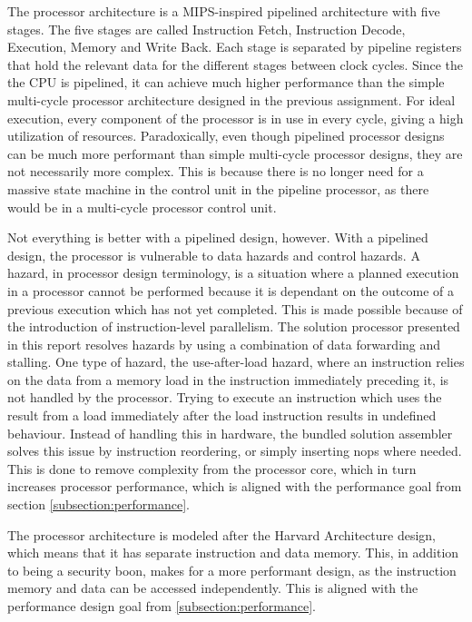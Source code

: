 The processor architecture is a MIPS-inspired pipelined architecture with five stages.
The five stages are called Instruction Fetch, Instruction Decode, Execution, Memory and Write Back.
Each stage is separated by pipeline registers that hold the relevant data for the different stages between clock cycles.
Since the the CPU is pipelined, it can achieve much higher performance than the simple multi-cycle processor architecture designed in the previous assignment\cite{assignment-1}.
For ideal execution, every component of the processor is in use in every cycle, giving a high utilization of resources.
Paradoxically, even though pipelined processor designs can be much more performant than simple multi-cycle processor designs, they are not necessarily more complex.
This is because there is no longer need for a massive state machine in the control unit in the pipeline processor, as there would be in a multi-cycle processor control unit.

Not everything is better with a pipelined design, however.
With a pipelined design, the processor is vulnerable to data hazards and control hazards.
A hazard, in processor design terminology, is a situation where a planned execution in a processor cannot be performed because it is dependant on the outcome of a previous execution which has not yet completed.
This is made possible because of the introduction of instruction-level parallelism.
The solution processor presented in this report resolves hazards by using a combination of data forwarding and stalling.
One type of hazard, the use-after-load hazard, where an instruction relies on the data from a memory load in the instruction immediately preceding it, is not handled by the processor.
Trying to execute an instruction which uses the result from a load immediately after the load instruction results in undefined behaviour.
Instead of handling this in hardware, the bundled solution assembler solves this issue by instruction reordering, or simply inserting nops where needed.
This is done to remove complexity from the processor core, which in turn increases processor performance, which is aligned with the performance goal from section \vref{subsection:performance}.

The processor architecture is modeled after the Harvard Architecture design, which means that it has separate instruction and data memory.
This, in addition to being a security boon, makes for a more performant design, as the instruction memory and data can be accessed independently.
This is aligned with the performance design goal from \vref{subsection:performance}.

